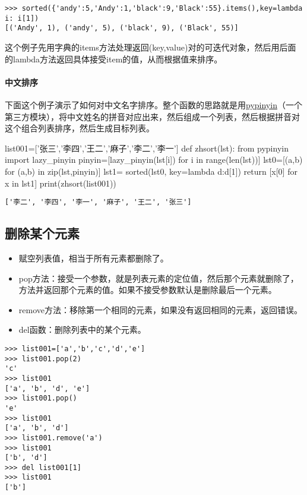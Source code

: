 \documentclass[12pt,oneside]{book}
\begin{document}
\begin{common-format}
\begin{Verbatim}
>>> sorted({'andy':5,'Andy':1,'black':9,'Black':55}.items(),key=lambda i: i[1])
[('Andy', 1), ('andy', 5), ('black', 9), ('Black', 55)]
\end{Verbatim}

这个例子先用字典的items方法处理返回(key,value)对的可迭代对象，然后用后面的lambda方法返回具体接受item的值，从而根据值来排序。


\paragraph{中文排序}
下面这个例子演示了如何对中文名字排序。整个函数的思路就是用\href{https://github.com/mozillazg/python-pinyin}{pypinyin}（一个第三方模块），将中文姓名的拼音对应出来，然后组成一个列表，然后根据拼音对这个组合列表排序，然后生成目标列表。
\begin{tcbpython}[]
list001=['张三','李四','王二','麻子','李二','李一']
def zhsort(lst):
    from pypinyin import  lazy_pinyin
    pinyin=[lazy_pinyin(lst[i]) for i in range(len(lst))]
    lst0=[(a,b) for (a,b) in zip(lst,pinyin)]
    lst1= sorted(lst0, key=lambda d:d[1])
    return [x[0] for x in lst1]
print(zhsort(list001))
\end{tcbpython}
\begin{Verbatim}
['李二', '李四', '李一', '麻子', '王二', '张三']
\end{Verbatim}



\subsection{删除某个元素}
\begin{itemize}
\item 赋空列表值，相当于所有元素都删除了。 
\item pop方法：接受一个参数，就是列表元素的定位值，然后那个元素就删除了，方法并返回那个元素的值。如果不接受参数默认是删除最后一个元素。
\item remove方法：移除第一个相同的元素，如果没有返回相同的元素，返回错误。
\item del函数：删除列表中的某个元素。
\end{itemize}

\begin{Verbatim}
>>> list001=['a','b','c','d','e']
>>> list001.pop(2)
'c'
>>> list001
['a', 'b', 'd', 'e']
>>> list001.pop()
'e'
>>> list001
['a', 'b', 'd']
>>> list001.remove('a')
>>> list001
['b', 'd']
>>> del list001[1]
>>> list001
['b']
\end{Verbatim}



\end{common-format}
\end{document}
